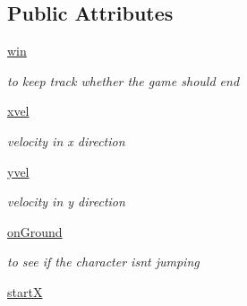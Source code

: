 \subsection*{Public Attributes}
\begin{DoxyCompactItemize}
\item 
\hyperlink{classplayer_1_1_player_aba84dd227f561af4f4dda3880912bf1b}{win}\hypertarget{classplayer_1_1_player_aba84dd227f561af4f4dda3880912bf1b}{}\label{classplayer_1_1_player_aba84dd227f561af4f4dda3880912bf1b}

\begin{DoxyCompactList}\small\item\em to keep track whether the game should end \end{DoxyCompactList}\item 
\hyperlink{classplayer_1_1_player_ae073642fcdedce9559f717e60945e51f}{xvel}\hypertarget{classplayer_1_1_player_ae073642fcdedce9559f717e60945e51f}{}\label{classplayer_1_1_player_ae073642fcdedce9559f717e60945e51f}

\begin{DoxyCompactList}\small\item\em velocity in x direction \end{DoxyCompactList}\item 
\hyperlink{classplayer_1_1_player_a91226d0b71959f0a35b280c6e2774e2d}{yvel}\hypertarget{classplayer_1_1_player_a91226d0b71959f0a35b280c6e2774e2d}{}\label{classplayer_1_1_player_a91226d0b71959f0a35b280c6e2774e2d}

\begin{DoxyCompactList}\small\item\em velocity in y direction \end{DoxyCompactList}\item 
\hyperlink{classplayer_1_1_player_a3ad9f576ec329032c97a04f93ff53f88}{on\+Ground}\hypertarget{classplayer_1_1_player_a3ad9f576ec329032c97a04f93ff53f88}{}\label{classplayer_1_1_player_a3ad9f576ec329032c97a04f93ff53f88}

\begin{DoxyCompactList}\small\item\em to see if the character isn\textquotesingle{}t jumping \end{DoxyCompactList}\item 
\hyperlink{classplayer_1_1_player_a7727dfee393c4814eb2cb7090f2f3788}{startX}\hypertarget{classplayer_1_1_player_a7727dfee393c4814eb2cb7090f2f3788}{}\label{classplayer_1_1_player_a7727dfee393c4814eb2cb7090f2f3788}


\end{DoxyCompactItemize}
